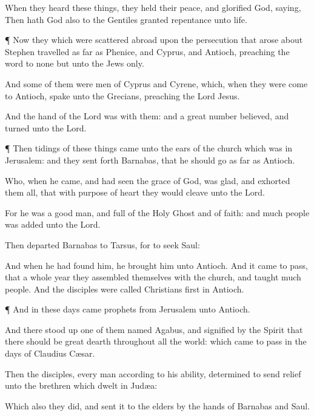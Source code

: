 {When they
heard these
things, they held their
peace,
and
glorified
God,
saying,
Then
hath
God
also to the
Gentiles
granted
repentance
unto
life.


\par }{\PP {}¶
Now
they which were scattered
abroad
upon the
persecution that
arose
about
Stephen
travelled as far
as
Phenice,
and
Cyprus,
and
Antioch,
preaching the
word to
none
but unto the
Jews
only.

And
some
of
them
were
men of
Cyprus
and
Cyrene,
which, when they were
come
to
Antioch,
spake
unto the
Grecians,
preaching the
Lord
Jesus.

And the
hand of the
Lord
was
with
them:
and a
great
number
believed, and
turned
unto the
Lord.


\par }{\PP {}¶
Then
tidings
of these
things
came
unto the
ears of the
church which
was
in
Jerusalem:
and they sent
forth
Barnabas, that he should
go as far
as
Antioch.

Who, when he
came,
and had
seen the
grace of
God, was
glad,
and
exhorted them
all, that with
purpose of
heart they would
cleave unto the
Lord.

For he
was a
good
man,
and
full of the
Holy
Ghost
and of
faith:
and
much
people was
added unto the
Lord.

Then
departed
Barnabas
to
Tarsus, for to
seek
Saul:

And when he had
found
him, he
brought
him
unto
Antioch.
And it came to pass,
that a
whole
year they
assembled
themselves
with the
church,
and
taught
much
people.
And the
disciples were
called
Christians
first
in
Antioch.


\par }{\PP {}¶
And
in
these
days
came
prophets
from
Jerusalem
unto
Antioch.

And there stood
up
one
of
them
named
Agabus, and
signified
by the
Spirit that there
should
be
great
dearth
throughout
all the
world:
which came to
pass
in the days of
Claudius
Cæsar.

Then the
disciples,
every
man according
to
his
ability,
determined to
send
relief
unto the
brethren
which
dwelt
in
Judæa:

Which
also they
did, and sent
it
to the
elders
by the
hands of
Barnabas
and
Saul.




\par }
